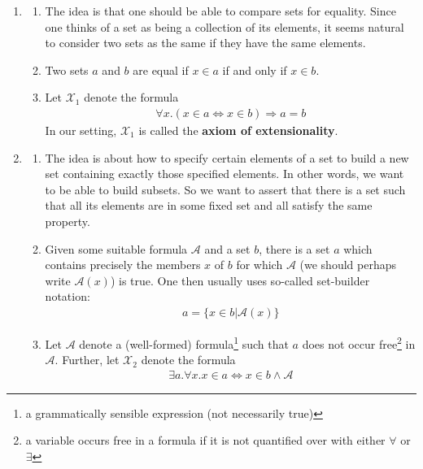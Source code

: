 \begin{enumerate}
\item[(1)]
\begin{enumerate}
\item[$\bullet$]
The idea is that one should be able to compare sets for equality.
Since one thinks of a set as being a collection of its elements, it seems natural to consider two sets as the same if they have the same elements.
\item[$\bullet$]
Two sets $a$ and $b$ are equal if $x \in a$ if and only if $x \in b$.
\item[$\bullet$]
Let $\mathcal{X}_{1}$ denote the formula
\begin{align*}
  \forall
  x
  .
  \left(
    x
    \in
    a
    \Leftrightarrow
    x
    \in
    b
  \right)
  \Rightarrow
  a
  =
  b
\end{align*}
In our setting, $\mathcal{X}_{1}$ is called the \textbf{axiom of extensionality}.
\end{enumerate}
\item[(2)]
\begin{enumerate}
\item[$\bullet$]
The idea is about how to specify certain elements of a set to build a new set containing exactly those specified elements.
In other words, we want to be able to build subsets.
So we want to assert that there is a set such that all its elements are in some fixed set and all satisfy the same property.
\item[$\bullet$]
Given some suitable formula $\mathcal{A}$ and a set $b$, there is a set $a$ which contains precisely the members $x$ of $b$ for which $\mathcal{A}$ (we should perhaps write $\mathcal{A}(x)$) is true.
One then usually uses so-called set-builder notation:
\begin{align*}
  a
  =
  \lbrace
      x
      \in
      b
    \vert
      \mathcal{A}(x)
  \rbrace
\end{align*}
\item[$\bullet$]
Let $\mathcal{A}$ denote a (well-formed) formula\footnote{a grammatically sensible expression (not necessarily true)} such that $a$ does not occur free\footnote{a variable occurs free in a formula if it is not quantified over with either $\forall$ or $\exists$} in $\mathcal{A}$.
Further, let $\mathcal{X}_{2}$ denote the formula
\begin{align*}
  \exists
  a
  .
  \forall
  x
  .
  x
  \in
  a
  \Leftrightarrow
  x
  \in
  b
  \land
  \mathcal{A}
\end{align*}

\end{enumerate}
\end{enumerate}
